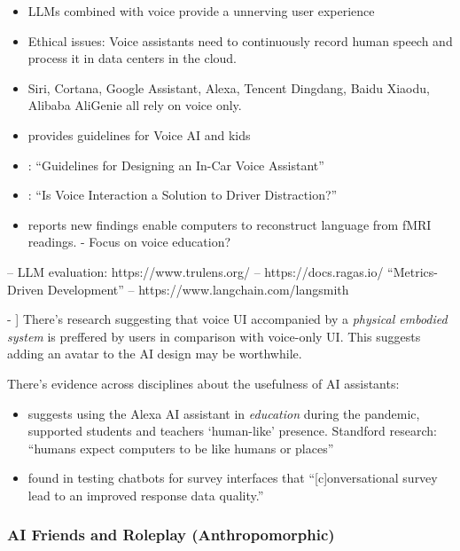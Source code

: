 \documentclass[
  letterpaper,
  DIV=11,
  numbers=noendperiod]{scrartcl}
\providecommand{\tightlist}{%
  \setlength{\itemsep}{0pt}\setlength{\parskip}{0pt}}\usepackage{longtable,booktabs,array}
\begin{document}
\begin{itemize}
\tightlist
\item
  LLMs combined with voice provide a unnerving user experience
  \citet{ethanmollick2023}
\item
  Ethical issues: Voice assistants need to continuously record human
  speech and process it in data centers in the cloud.
\item
  Siri, Cortana, Google Assistant, Alexa, Tencent Dingdang, Baidu
  Xiaodu, Alibaba AliGenie all rely on voice only.
\item
  \citet{szczukaHowChildrenAcquire2022} provides guidelines for Voice AI
  and kids
\item
  \citet{casperkesselsGuidelinesDesigningInCar2022}: ``Guidelines for
  Designing an In-Car Voice Assistant''
\item
  \citet{casperkesselsVoiceInteractionSolution2022}: ``Is Voice
  Interaction a Solution to Driver Distraction?''
\item
  \citet{tangSemanticReconstructionContinuous2022} reports new findings
  enable computers to reconstruct language from fMRI readings. - Focus
  on voice education?
\end{itemize}

-- LLM evaluation: https://www.trulens.org/
\citet{leinoInfluenceDirectedExplanationsDeep2018} --
https://docs.ragas.io/ ``Metrics-Driven Development'' --
https://www.langchain.com/langsmith

- \citep{CELINO2020102410}{]} There's research suggesting that voice UI
accompanied by a \emph{physical embodied system} is preffered by users
in comparison with voice-only UI. This suggests adding an avatar to the
AI design may be worthwhile.

There's evidence across disciplines about the usefulness of AI
assistants:

\begin{itemize}
\tightlist
\item
  \citep{SERBAN20202849} suggests using the Alexa AI assistant in
  \emph{education} during the pandemic, supported students and teachers
  `human-like' presence. Standford research: ``humans expect computers
  to be like humans or places''
\item
  \citep{CELINO2020102410} found in testing chatbots for survey
  interfaces that ``{[}c{]}onversational survey lead to an improved
  response data quality.''
\end{itemize}

\subsubsection{AI Friends and Roleplay
(Anthropomorphic)}\label{ai-friends-and-roleplay-anthropomorphic}
\end{document}
